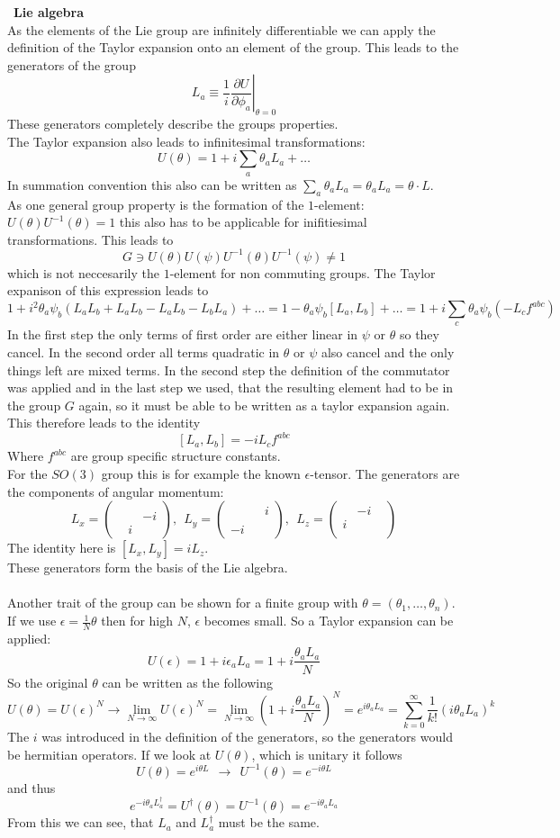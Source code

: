 \documentclass{include/thesisclass}
\newcommand{\cc}{\cdot}
\newcommand{\df}{\rightarrow}
\newcommand{\p}{\partial}
\newcommand{\eps}{\epsilon}
\newcommand{\Mat}[9]{\begin{pmatrix}#1&#2&#3\\#4&#5&#6\\#7&#8&#9\end{pmatrix}}
\newcommand{\sub}[1]{~\newline\newline\textbf{#1}\\}
\begin{document}
\sub{Lie algebra}
As the elements of the Lie group are infinitely differentiable we can apply the definition of the Taylor expansion onto an element of the group. This leads to the generators of the group
\[L_a \equiv \frac{1}{i} \left.\frac{\p U}{\p \phi_a} \right|_{\theta = 0}\]
These generators completely describe the groups properties.\\
The Taylor expansion also leads to infinitesimal transformations:
\[ U(\theta) = 1 + i \sum_a \theta_a L_a + \ldots\]
In summation convention this also can be written as $\sum_a \theta_a L_a = \theta_a L_a = \theta\cc L$.\\
As one general group property is the formation of the $1$-element: $U(\theta)U^{-1}(\theta) = 1$ this also has to be applicable for inifitiesimal transformations. This leads to
\[ G \ni U(\theta)U(\psi)U^{-1}(\theta)U^{-1}(\psi) \neq 1\]
which is not neccesarily the $1$-element for non commuting groups. The Taylor expanison of this expression leads to
\[ 1 + i^2 \theta_a\psi_b ( L_aL_b + L_aL_b - L_aL_b - L_bL_a) + \ldots = 1 - \theta_a \psi_b [L_a, L_b]+\ldots = 1 + i \sum_c \theta_a \psi_b ( - L_c f^{abc})\]
In the first step the only terms of first order are either linear in $\psi$ or $\theta$ so they cancel. In the second order all terms quadratic in $\theta$ or $\psi$ also cancel and the only things left are mixed terms. In the second step the definition of the commutator was applied and in the last step we used, that the resulting element had to be in the group $G$ again, so it must be able to be written as a taylor expansion again. This therefore leads to the identity
\[ [ L_a, L_b] = -i L_c f^{abc}\]
Where $f^{abc}$ are group specific structure constants.\\
For the $SO(3)$ group this is for example the known $\eps$-tensor. The generators are the components of angular momentum:
\[L_x = \Mat{}{}{}{}{}{-i}{}{i}{}, ~~ L_y = \Mat{}{}{i}{}{}{}{-i}{}{}, ~~L_z = \Mat{}{-i}{}{i}{}{}{}{}{}\]
The identity here is $[L_x,L_y] = iL_z$.\\
These generators form the basis of the Lie algebra.\\
\\
Another trait of the group can be shown for a finite group with $\theta = (\theta_1, \ldots, \theta_n)$. If we use $\eps = \frac{1}{N}\theta$ then for high $N$, $\eps$ becomes small. So a Taylor expansion can be applied:
\[ U(\eps) = 1 + i \eps_a L_a = 1 + i \frac{\theta_a L_a}{N}\]
So the original $\theta$ can be written as the following
\[ U(\theta) = U(\eps)^N \df \lim_{N \df \infty} U(\eps) ^N = \lim_{N\df\infty} \left( 1 + i \frac{\theta_aL_a}{N}\right)^N = e^{i\theta_aL_a} = \sum_{k = 0}^{\infty}\frac{1}{k!}(i\theta_aL_a)^k\]
The $i$ was introduced in the definition of the generators, so the generators would be hermitian operators. If we look at $U(\theta)$, which is unitary it follows
\[ U(\theta) = e^{i\theta L} ~~\df~~ U^{-1}(\theta) = e^{-i\theta L}\]
and thus
\[ e^{-i\theta_aL_a^\dagger} = U^\dagger(\theta) = U^{-1}(\theta) = e^{-i\theta_aL_a}\]
From this we can see, that $L_a$ and $L_a^\dagger$ must be the same.
\end{document}
